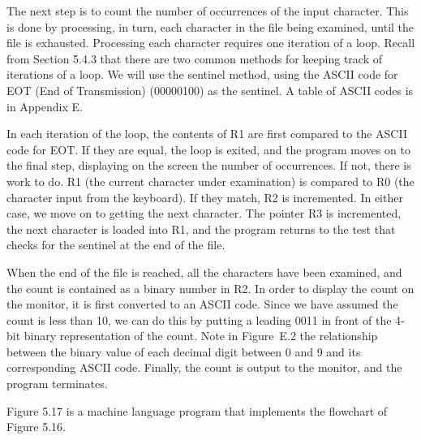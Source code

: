 \documentclass{patt}
\begin{document}
The next step is to count the number of occurrences of the input
character. This is done by processing, in turn, each character in the
file being examined, until the file is exhausted.  Processing each
character requires one iteration of a loop.  Recall from Section 5.4.3
that there are two common methods for keeping track of iterations of a
loop.  We will use the sentinel method, using the ASCII code for EOT
(End of Transmission) (00000100) as the sentinel. A table of ASCII 
codes is in Appendix E.

In each iteration of the loop, the contents of R1 are first compared
to the ASCII code for EOT.  If they are equal, the loop is exited, and
the program moves on to the final step, displaying on the screen the
number of occurrences.  If not, there is work to do.  R1 (the current
character under examination) is compared to R0 (the character input
from the keyboard).  If they match, R2 is incremented. In either case,
we move on to getting the next character.  The pointer R3 is incremented, 
the next character is loaded into R1, and the program returns to the test 
that checks for the sentinel at the end of the file.

When the end of the file is reached, all the characters have been
examined, and the count is contained as a binary number in R2.  In
order to display the count on the monitor, it is first converted to an 
ASCII code.  Since we have assumed the count is less than 10, we can do 
this by putting a leading 0011 in front of the
4-bit binary representation of the count.  Note in Figure~E.2 the 
relationship between the binary value of
each decimal digit between 0 and 9 and its corresponding ASCII code.
Finally, the count is output to the monitor, and the program
terminates.

Figure 5.17 is a machine language program that implements the
flowchart of Figure 5.16.
\end{document}
